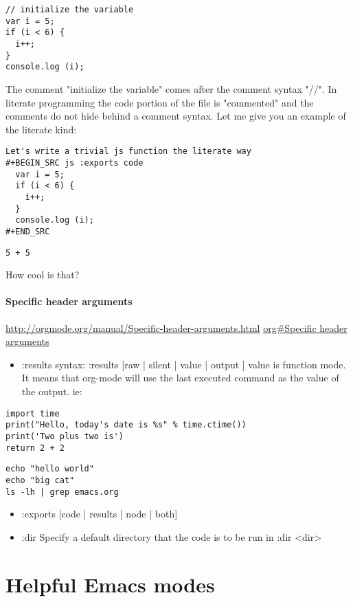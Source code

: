 \documentclass[11pt]{article}
\begin{document}
\begin{verbatim}
// initialize the variable
var i = 5;
if (i < 6) {
  i++;
}
console.log (i);
\end{verbatim}

The comment "initialize the variable" comes after the comment syntax "//".  In literate programming the code portion of the file is "commented" and the comments do not hide behind a comment syntax.  Let me give you an example of the literate kind:

\begin{verbatim}
Let's write a trivial js function the literate way
#+BEGIN_SRC js :exports code
  var i = 5;
  if (i < 6) {
    i++;
  }
  console.log (i);
#+END_SRC
\end{verbatim}

\begin{verbatim}
5 + 5
\end{verbatim}

How cool is that?
\paragraph{Specific header arguments}
\label{sec:orgheadline14}
\url{http://orgmode.org/manual/Specific-header-arguments.html}
\href{org#Specific\%20header\%20arguments}{\url{org#Specific} header arguments}

\begin{itemize}
\item :results
syntax:
:results [raw | silent | value | output ]
value is function mode.  It means that org-mode will use the last executed command as the value of the output.
ie:
\end{itemize}

\begin{verbatim}
import time
print("Hello, today's date is %s" % time.ctime())
print('Two plus two is')
return 2 + 2
\end{verbatim}

\begin{verbatim}
echo "hello world"
echo "big cat"
ls -lh | grep emacs.org
\end{verbatim}

\begin{itemize}
\item :exports [code | results | node | both]
\item :dir
Specify a default directory that the code is to be run in
:dir <dir>
\end{itemize}
\section{Helpful Emacs modes}
\label{sec:orgheadline37}
\end{document}
